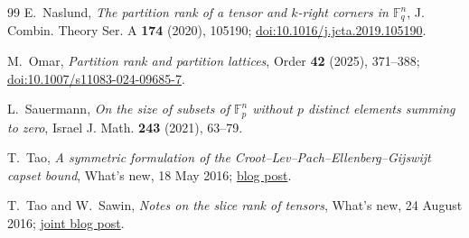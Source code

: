 \documentclass[10pt,a4paper]{amsart}
\theoremstyle{definition}
\newcommand{\F}{\mathbb F}
\newcommand{\1}{\mathbf 1}
\begin{document}
\begin{thebibliography}{99}
E.~Naslund,
\emph{The partition rank of a tensor and $k$-right corners in $\F_q^n$},
J. Combin. Theory Ser. A \textbf{174} (2020), 105190;
\href{https://doi.org/10.1016/j.jcta.2019.105190}{doi:10.1016/j.jcta.2019.105190}.


M.~Omar,
\emph{Partition rank and partition lattices},
Order \textbf{42} (2025), 371--388;
\href{https://doi.org/10.1007/s11083-024-09685-7}{doi:10.1007/s11083-024-09685-7}.



L.~Sauermann,
\emph{On the size of subsets of $\F_p^n$ without $p$ distinct elements summing to zero},
Israel J. Math. \textbf{243} (2021), 63--79.

T.~Tao,
\emph{A symmetric formulation of the Croot--Lev--Pach--Ellenberg--Gijswijt capset bound},
What's new, 18 May 2016;
\href{https://terrytao.wordpress.com/2016/05/18/a-symmetric-formulation-of-the-croot-lev-pach-ellenberg-gijswijt-capset-bound/}{blog post}.

T.~Tao and W.~Sawin,
\emph{Notes on the slice rank of tensors},
What's new, 24 August 2016;
\href{https://terrytao.wordpress.com/2016/08/24/notes-on-the-slice-rank-of-tensors/}{joint blog post}.

\end{thebibliography}
\end{document}
